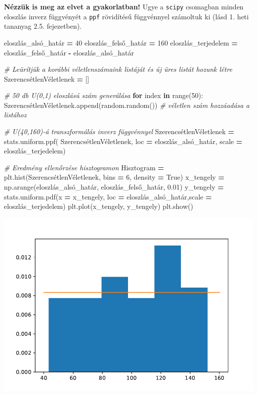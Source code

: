 \documentclass[
]{book}
\newenvironment{Shaded}{\begin{snugshade}}{\end{snugshade}}
\newcommand{\BuiltInTok}[1]{#1}
\newcommand{\CommentTok}[1]{\textcolor[rgb]{0.56,0.35,0.01}{\textit{#1}}}
\newcommand{\ControlFlowTok}[1]{\textcolor[rgb]{0.13,0.29,0.53}{\textbf{#1}}}
\newcommand{\DecValTok}[1]{\textcolor[rgb]{0.00,0.00,0.81}{#1}}
\newcommand{\FloatTok}[1]{\textcolor[rgb]{0.00,0.00,0.81}{#1}}
\newcommand{\KeywordTok}[1]{\textcolor[rgb]{0.13,0.29,0.53}{\textbf{#1}}}
\newcommand{\NormalTok}[1]{#1}
\newcommand{\OperatorTok}[1]{\textcolor[rgb]{0.81,0.36,0.00}{\textbf{#1}}}
\newcommand{\VariableTok}[1]{\textcolor[rgb]{0.00,0.00,0.00}{#1}}
\begin{document}
\textbf{Nézzük is meg az elvet a gyakorlatban!} Ugye a \texttt{scipy} csomagban minden eloszlás inverz függvényét a \texttt{ppf} rövidítésű függvénnyel számoltuk ki (lásd 1. heti tananyag 2.5. fejezetben).

\begin{Shaded}
\begin{Highlighting}[]
\NormalTok{eloszlás\_alsó\_határ }\OperatorTok{=} \DecValTok{40}
\NormalTok{eloszlás\_felső\_határ }\OperatorTok{=} \DecValTok{160}
\NormalTok{eloszlás\_terjedelem }\OperatorTok{=}\NormalTok{ eloszlás\_felső\_határ }\OperatorTok{{-}}\NormalTok{ eloszlás\_alsó\_határ}

\CommentTok{\# Leürítjük a korábbi véletlenszámaink listáját és új üres listát hozunk létre}
\NormalTok{SzerencsétlenVéletlenek }\OperatorTok{=}\NormalTok{ []}

\CommentTok{\# 50 db U(0,1) eloszlású szám generálása}
\ControlFlowTok{for}\NormalTok{ index }\KeywordTok{in} \BuiltInTok{range}\NormalTok{(}\DecValTok{50}\NormalTok{):}
\NormalTok{  SzerencsétlenVéletlenek.append(random.random()) }\CommentTok{\# véletlen szám hozzáadása a listához}

\CommentTok{\# U(40,160){-}á transzformálás inverz függvénnyel}
\NormalTok{SzerencsétlenVéletlenek }\OperatorTok{=}\NormalTok{ stats.uniform.ppf(}
\NormalTok{  SzerencsétlenVéletlenek,}
\NormalTok{  loc }\OperatorTok{=}\NormalTok{ eloszlás\_alsó\_határ,}
\NormalTok{  scale }\OperatorTok{=}\NormalTok{ eloszlás\_terjedelem)}

\CommentTok{\# Eredmény ellenőrzése hisztogramon}
\NormalTok{Hisztogram }\OperatorTok{=}\NormalTok{ plt.hist(SzerencsétlenVéletlenek, bins }\OperatorTok{=} \DecValTok{6}\NormalTok{, density }\OperatorTok{=} \VariableTok{True}\NormalTok{)}
\NormalTok{x\_tengely }\OperatorTok{=}\NormalTok{ np.arange(eloszlás\_alsó\_határ, eloszlás\_felső\_határ, }\FloatTok{0.01}\NormalTok{)}
\NormalTok{y\_tengely }\OperatorTok{=}\NormalTok{ stats.uniform.pdf(x }\OperatorTok{=}\NormalTok{ x\_tengely, loc }\OperatorTok{=}\NormalTok{ eloszlás\_alsó\_határ,scale }\OperatorTok{=}\NormalTok{ eloszlás\_terjedelem)}
\NormalTok{plt.plot(x\_tengely, y\_tengely)}
\NormalTok{plt.show()}
\end{Highlighting}
\end{Shaded}

\includegraphics{_main_files/figure-latex/unnamed-chunk-207-7.pdf}
\end{document}
